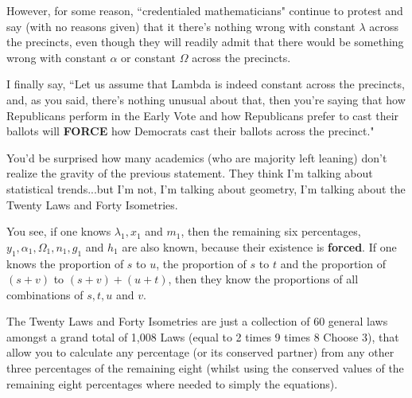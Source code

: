 However, for some reason, ``credentialed mathematicians" continue to protest and say (with no reasons given) that it there's nothing wrong with constant $\lambda$ across the precincts, even though they will readily admit that there would be something wrong with constant $\alpha$ or constant $\Omega$ across the precincts.

I finally say, ``Let us assume that Lambda is indeed constant across the precincts, and, as you said, there's nothing unusual about that, then you're saying that how Republicans perform in the Early Vote and how Republicans prefer to cast their ballots will \textbf{FORCE} how Democrats cast their ballots across the precinct."

You'd be surprised how many academics (who are majority left leaning) don't realize the gravity of the previous statement. They think I'm talking about statistical trends...but I'm not, I'm talking about geometry, I'm talking about the Twenty Laws and Forty Isometries.

You see, if one knows $\lambda_{1},x_{1}$  and $m_{1}$, then the remaining six percentages, $y_{1}, \alpha_{1}, \Omega_{1}, n_{1}, g_{1}$ and $h_{1}$ are also known, because their existence is \textbf{forced}. If one knows the proportion of $s$ to $u$, the proportion of $s$ to $t$ and the proportion of $(s+v)$ to $(s+v)+(u+t)$, then they know the proportions of all combinations of $s,t,u$ and $v$.

The Twenty Laws and Forty Isometries are just a collection of 60 general laws amongst a grand total of 1,008 Laws (equal to 2 times 9 times 8 Choose 3), that allow you to calculate any percentage (or its conserved partner) from any other three percentages of the remaining eight (whilst using the conserved values of the remaining eight percentages where needed to simply the equations).

